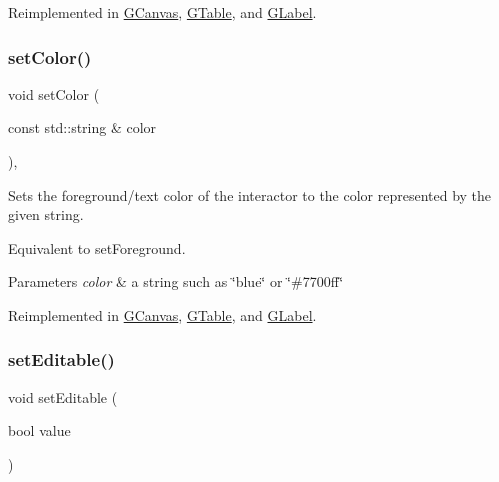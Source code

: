 Reimplemented in \mbox{\hyperlink{classGCanvas_a292eb0ce61f3fdb1d28b17e1e34928f7}{G\+Canvas}}, \mbox{\hyperlink{classGTable_afd1f50a2c4695c79b8633d860bce5398}{G\+Table}}, and \mbox{\hyperlink{classGLabel_afd1f50a2c4695c79b8633d860bce5398}{G\+Label}}.

\mbox{\label{classGInteractor_a61374df6c11b52cfbb0815decdbaebc6}} 
\subsubsection{\texorpdfstring{set\+Color()}{setColor()}\hspace{0.1cm}{\footnotesize\ttfamily [2/2]}}
{\footnotesize\ttfamily void set\+Color (\begin{DoxyParamCaption}\item[{const std\+::string \&}]{color }\end{DoxyParamCaption})\hspace{0.3cm}{\ttfamily [virtual]}, {\ttfamily [inherited]}}



Sets the foreground/text color of the interactor to the color represented by the given string. 

Equivalent to set\+Foreground. 
\begin{DoxyParams}{Parameters}
{\em color} & a string such as \char`\"{}blue\char`\"{} or \char`\"{}\#7700ff\char`\"{} \\
\hline
\end{DoxyParams}


Reimplemented in \mbox{\hyperlink{classGCanvas_ad148324da1b0340e84e24dffa577ffca}{G\+Canvas}}, \mbox{\hyperlink{classGTable_ad148324da1b0340e84e24dffa577ffca}{G\+Table}}, and \mbox{\hyperlink{classGLabel_ad148324da1b0340e84e24dffa577ffca}{G\+Label}}.

\mbox{\label{classGTextField_a008d7fd44fb3e7a6886cdaddbc3644a2}} 
\subsubsection{\texorpdfstring{set\+Editable()}{setEditable()}}
{\footnotesize\ttfamily void set\+Editable (\begin{DoxyParamCaption}\item[{bool}]{value }\end{DoxyParamCaption})\hspace{0.3cm}{\ttfamily [virtual]}}



